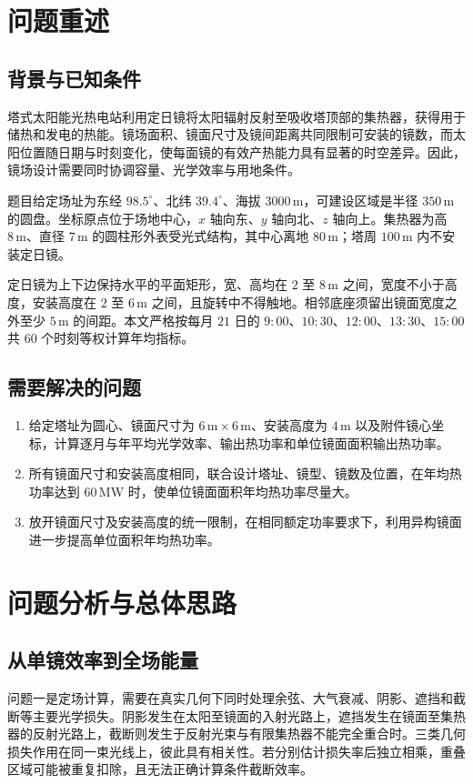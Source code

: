\documentclass[UTF8,a4paper,zihao=-4,fontset=mac]{ctexart}
\begin{document}
\section{问题重述}
\subsection{背景与已知条件}
塔式太阳能光热电站利用定日镜将太阳辐射反射至吸收塔顶部的集热器，获得用于储热和发电的热能。镜场面积、镜面尺寸及镜间距离共同限制可安装的镜数，而太阳位置随日期与时刻变化，使每面镜的有效产热能力具有显著的时空差异。因此，镜场设计需要同时协调容量、光学效率与用地条件。

题目给定场址为东经 $98.5^\circ$、北纬 $39.4^\circ$、海拔 $3000\,\mathrm m$，可建设区域是半径 $350\,\mathrm m$ 的圆盘。坐标原点位于场地中心，$x$ 轴向东、$y$ 轴向北、$z$ 轴向上。集热器为高 $8\,\mathrm m$、直径 $7\,\mathrm m$ 的圆柱形外表受光式结构，其中心离地 $80\,\mathrm m$；塔周 $100\,\mathrm m$ 内不安装定日镜。

定日镜为上下边保持水平的平面矩形，宽、高均在 $2$ 至 $8\,\mathrm m$ 之间，宽度不小于高度，安装高度在 $2$ 至 $6\,\mathrm m$ 之间，且旋转中不得触地。相邻底座须留出镜面宽度之外至少 $5\,\mathrm m$ 的间距。本文严格按每月 $21$ 日的 $9{:}00$、$10{:}30$、$12{:}00$、$13{:}30$、$15{:}00$ 共 $60$ 个时刻等权计算年均指标\cite{problem}。

\subsection{需要解决的问题}
\begin{enumerate}[label=（\arabic*）]
\item 给定塔址为圆心、镜面尺寸为 $6\,\mathrm m\times6\,\mathrm m$、安装高度为 $4\,\mathrm m$ 以及附件镜心坐标，计算逐月与年平均光学效率、输出热功率和单位镜面面积输出热功率。
\item 所有镜面尺寸和安装高度相同，联合设计塔址、镜型、镜数及位置，在年均热功率达到 $60\,\mathrm{MW}$ 时，使单位镜面面积年均热功率尽量大。
\item 放开镜面尺寸及安装高度的统一限制，在相同额定功率要求下，利用异构镜面进一步提高单位面积年均热功率。
\end{enumerate}

\section{问题分析与总体思路}
\subsection{从单镜效率到全场能量}
问题一是定场计算，需要在真实几何下同时处理余弦、大气衰减、阴影、遮挡和截断等主要光学损失\cite{zhang,farges}。阴影发生在太阳至镜面的入射光路上，遮挡发生在镜面至集热器的反射光路上，截断则发生于反射光束与有限集热器不能完全重合时。三类几何损失作用在同一束光线上，彼此具有相关性。若分别估计损失率后独立相乘，重叠区域可能被重复扣除，且无法正确计算条件截断效率。
\end{document}

